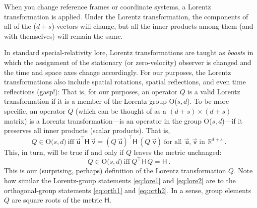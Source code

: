\documentclass{article}
\newcommand{\metric}{\mathsf{H}}
\newcommand\upvec[1]{\!\vec{\,\mathrm{#1}}}
\newcommand{\Lvec}[1]{\upvec{\mathsf{#1}}} %
\newcommand{\plus}{\!+\!} %
\begin{document}
When you change reference frames or coordinate systems, a Lorentz transformation is applied.
Under the Lorentz transformation, the components of all of the ($d\plus s$)-vectors will change, but all the inner products among them (and with themselves) will remain the same.

In standard special-relativity lore, Lorentz transformations are taught as \emph{boosts} in which the assignment of the stationary (or zero-velocity) observer is changed and the time and space axes change accordingly.
For our purposes, the Lorentz transformations also include spatial rotations, spatial reflections, and even time reflections (gasp!):
That is, for our purposes, an operator $Q$ is a valid Lorentz transformation if it is a member of the Lorentz group O($s,d$).
To be more specific, an operator $Q$ (which can be thought of as a $(d+s)\times(d+s)$ matrix) is a Lorentz transformation---is an operator in the group O($s,d$)---if it preserves all inner products (scalar products). 
That is,
\begin{equation}
    Q \in \mbox{O($s,d$)} ~ \mbox{iff} ~ \Lvec{u}^\top\metric\,\Lvec{v}=(Q\,\Lvec{u})^\top\metric\,(Q\,\Lvec{v}) ~ \mbox{for all $\Lvec{u},\Lvec{v}$ in $\mathbb{R}^{d+s}$} ~.\label{eq:lore1}
\end{equation}
This, in turn, will be true if and only if $Q$ leaves the metric unchanged:
\begin{equation}
    Q \in \mbox{O($s,d$)} ~ \mbox{iff} ~ Q^\top\metric\,Q=\metric ~.\label{eq:lore2}
\end{equation}
This is our (surprising, perhaps) definition of the Lorentz transformation $Q$.
Note how similar the Lorentz-group statements \eqref{eq:lore1} and \eqref{eq:lore2} are to the orthogonal-group statements \eqref{eq:orth1} and \eqref{eq:orth2}.
In a sense, group elements $Q$ are square roots of the metric $\metric$.
\end{document}
